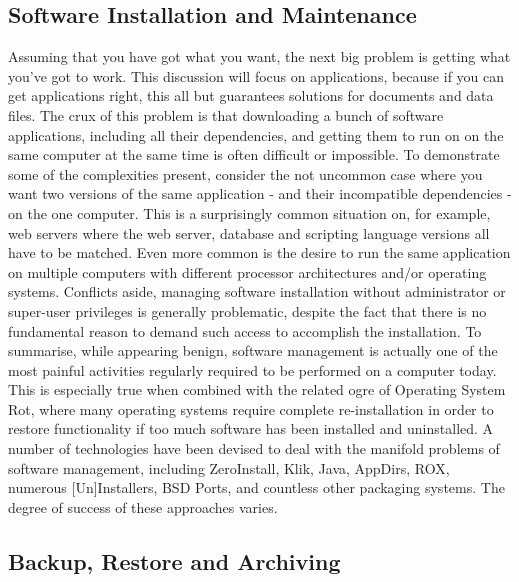 \documentclass[british,english]{article}
\begin{document}
\subsection{Software Installation and Maintenance}

Assuming that you have got what you want, the next big problem is
getting what you've got to work. This discussion will focus on applications,
because if you can get applications right, this all but guarantees
solutions for documents and data files. The crux of this problem is
that downloading a bunch of software applications, including all their
dependencies, and getting them to run on on the same computer at the
same time is often difficult or impossible. To demonstrate some of
the complexities present, consider the not uncommon case where you
want two versions of the same application - and their incompatible
dependencies - on the one computer. This is a surprisingly common
situation on, for example, web servers where the web server, database
and scripting language versions all have to be matched. Even more
common is the desire to run the same application on multiple computers
with different processor architectures and/or operating systems. Conflicts
aside, managing software installation without administrator or super-user
privileges is generally problematic, despite the fact that there is
no fundamental reason to demand such access to accomplish the installation.
To summarise, while appearing benign, software management is actually
one of the most painful activities regularly required to be performed
on a computer today. This is especially true when combined with the
related ogre of Operating System Rot, where many operating systems
require complete re-installation in order to restore functionality
if too much software has been installed and uninstalled. A number
of technologies have been devised to deal with the manifold problems
of software management, including ZeroInstall\citep{ZeroInstall},
Klik\citep{klik}, Java, AppDirs, ROX, numerous {[}Un]Installers,
BSD Ports, and countless other packaging systems. The degree of success
of these approaches varies.


\subsection{Backup, Restore and Archiving}
\end{document}
